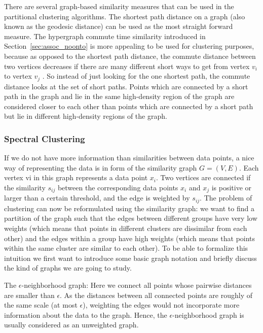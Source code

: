 There are several graph-based similarity measures that can be used in the partitional clustering algorithms. The shortest path distance on a graph (also known as the geodesic distance) can be used as the most straight forward measure.
The hypergraph commute time similarity introduced in Section~\ref{sec:assoc_noonto} is more appealing to be used for clustering purposes, because as opposed to the shortest path distance, the commute distance between two vertices decreases if there are many different short ways to get from vertex $v_i$ to vertex $v_j$ . So instead of just looking for the one shortest path, the commute distance looks at the set of short paths. Points which are connected by a short path in the graph and lie in the same high-density region of the graph are considered closer to each other than points which are connected by a short path but lie in different high-density regions of the graph.

\subsubsection{Spectral Clustering}
If we do not have more information than similarities between data points, a nice way of representing the data is in form of the similarity graph $G = (V,E)$. Each vertex vi in this graph represents a data point $x_i$. Two vertices are connected if the similarity $s_{ij}$ between the corresponding data points $x_i$ and $x_j$ is positive or larger than a certain threshold, and the edge is weighted by $s_{ij}$. The problem of clustering can now be reformulated using the similarity graph: we want to find a partition of the graph such that the edges between different groups have very low weights (which means that points in different clusters are dissimilar from each other) and the edges within a group have high weights (which means that points within the same cluster are similar to each other). To be able to formalize this intuition we first want to introduce some basic graph notation and briefly discuss the kind of graphs we are going to study.

The $\epsilon$-neighborhood graph: Here we connect all points whose pairwise distances are smaller than $\epsilon$. As the distances between all connected points are roughly of the same scale (at most $\epsilon$), weighting the edges would not incorporate more information about the data to the graph. Hence, the $\epsilon$-neighborhood graph is usually considered as an unweighted graph.


